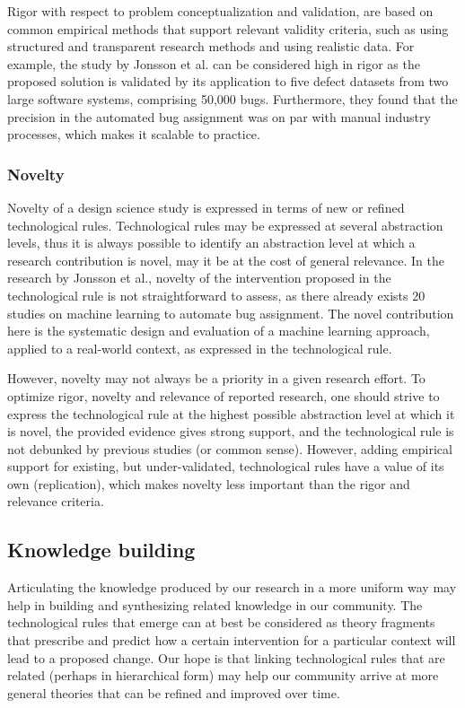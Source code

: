 \documentclass[graybox]{svmult}
\begin{document}
Rigor with respect to problem conceptualization and validation, are based on common empirical methods that support relevant validity criteria, such as using structured and transparent research methods and using realistic data. For example, the study by Jonsson et al. can be considered high in rigor as the proposed solution is validated by its application to five defect datasets from two large software systems, comprising 50,000 bugs. Furthermore, they found that the precision in the automated bug assignment was on par with manual industry processes, which makes it scalable to practice.

\subsubsection{Novelty} 
Novelty of a design science study is expressed in terms of new or refined technological rules. Technological rules may be expressed at several abstraction levels, thus it is always possible to identify an abstraction level at which a research contribution is novel, may it be at the cost of general relevance. In the research by Jonsson et al., novelty of the intervention proposed in the technological rule is not straightforward to assess, as there already exists 20 studies on machine learning to automate bug assignment. The novel contribution here is the systematic design and evaluation of a machine learning approach, applied to a real-world context, as expressed in the technological rule.

However, novelty may not always be a priority in a given research effort.
To optimize rigor, novelty and relevance of reported research, one should strive to express the technological rule at the highest possible abstraction level at which it is novel, the provided evidence gives strong support, and the technological rule is not debunked by previous studies (or common sense). However, adding empirical support for existing, but under-validated, technological rules have a value of its own (replication), which makes novelty less important than the rigor and relevance criteria.


\subsection{Knowledge building}
\label{sec:knowledge}

Articulating the knowledge produced by our research in a more uniform way may help in building and synthesizing related knowledge in our community. 
The technological rules that emerge can at best be considered as theory fragments that prescribe and predict how a certain intervention for a particular context will lead to a proposed change. 
Our hope is that linking technological rules that are related (perhaps in hierarchical form) may help our community arrive at more general theories that can be refined and improved over time.
\end{document}
